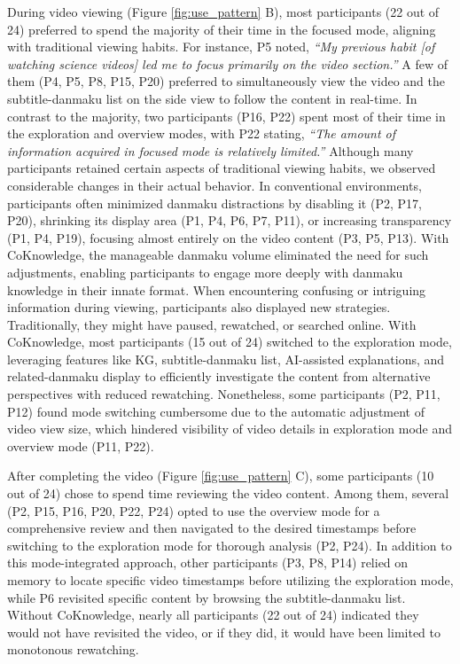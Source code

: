 During video viewing (Figure \ref{fig:use_pattern} B), most participants (22 out of 24) preferred to spend the majority of their time in the focused mode, aligning with traditional viewing habits. For instance, P5 noted, \textit{``My previous habit [of watching science videos] led me to focus primarily on the video section.''} A few of them (P4, P5, P8, P15, P20) preferred to simultaneously view the video and the subtitle-danmaku list on the side view to follow the content in real-time. In contrast to the majority, two participants (P16, P22) spent most of their time in the exploration and overview modes, with P22 stating, \textit{``The amount of information acquired in focused mode is relatively limited.''} Although many participants retained certain aspects of traditional viewing habits, we observed considerable changes in their actual behavior. In conventional environments, participants often minimized danmaku distractions by disabling it (P2, P17, P20), shrinking its display area (P1, P4, P6, P7, P11), or increasing transparency (P1, P4, P19), focusing almost entirely on the video content (P3, P5, P13). With CoKnowledge, the manageable danmaku volume eliminated the need for such adjustments, enabling participants to engage more deeply with danmaku knowledge in their innate format. When encountering confusing or intriguing information during viewing, participants also displayed new strategies. Traditionally, they might have paused, rewatched, or searched online. With CoKnowledge, most participants (15 out of 24) switched to the exploration mode, leveraging features like KG, subtitle-danmaku list, AI-assisted explanations, and related-danmaku display to efficiently investigate the content from alternative perspectives with reduced rewatching. Nonetheless, some participants (P2, P11, P12) found mode switching cumbersome due to the automatic adjustment of video view size, which hindered visibility of video details in exploration mode and overview mode (P11, P22).


After completing the video (Figure \ref{fig:use_pattern} C), some participants (10 out of 24) chose to spend time reviewing the video content. Among them, several (P2, P15, P16, P20, P22, P24) opted to use the overview mode for a comprehensive review and then navigated to the desired timestamps before switching to the exploration mode for thorough analysis (P2, P24). In addition to this mode-integrated approach, other participants (P3, P8, P14) relied on memory to locate specific video timestamps before utilizing the exploration mode, while P6 revisited specific content by browsing the subtitle-danmaku list. Without CoKnowledge, nearly all participants (22 out of 24) indicated they would not have revisited the video, or if they did, it would have been limited to monotonous rewatching.

